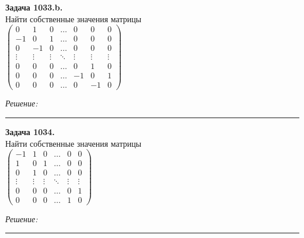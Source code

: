 \documentclass[a4paper, 12pt]{article}
\newenvironment{problem}[2][Задача]
    { \begin{mdframed}[backgroundcolor=gray!10] \textbf{#1 #2.} \\}
    {  \end{mdframed}}
\newenvironment{solution}
    {\textit{Решение: }}
    {\noindent\rule{7in}{1.5pt}}
\begin{document}
\begin{problem}{1033.b}
Найти собственные значения матрицы\\
$\left( \begin{array}{rrrrrrr}0 & 1 & 0 & \ldots & 0 & 0 & 0\\ -1 & 0 & 1 & \ldots & 0 & 0 & 0 \\ 0 & -1 & 0 & \ldots & 0 & 0 & 0 \\ \vdots & \vdots & \vdots & \ddots & \vdots & \vdots & \vdots \\ 0 & 0 & 0 & \ldots & 0 & 1 & 0 \\ 0 & 0 & 0 & \ldots & -1 & 0 & 1 \\ 0 & 0 & 0 & \ldots & 0 & -1 & 0 \end{array} \right)$

\end{problem}
\begin{solution}



\end{solution}

\begin{problem}{1034}
Найти собственные значения матрицы\\
$\left( \begin{array}{rrrrrr}-1 & 1 & 0 & \ldots & 0 & 0 \\ 1 & 0 & 1 & \ldots & 0 & 0 \\ 0 & 1 & 0 & \ldots & 0 & 0 \\ \vdots & \vdots & \vdots & \ddots & \vdots & \vdots \\ 0 & 0 & 0 & \ldots & 0 & 1 \\ 0 & 0 & 0 & \ldots & 1 & 0 \end{array} \right)$

\end{problem}
\begin{solution}



\end{solution}
\end{document}
